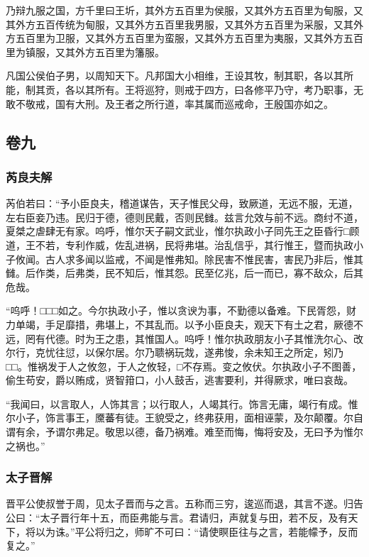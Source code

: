 \documentclass[]{article}
\begin{document}
乃辩九服之国，方千里曰王圻，其外方五百里为侯服，又其外方五百里为甸服，又其外方五百传统为甸服，又其外方五百里我男服，又其外方五百里为采服，又其外方五百里为卫服，又其外方五百里为蛮服，又其外方五百里为夷服，又其外方五百里为镇服，又其外方五百里为籓服。

凡国公侯伯子男，以周知天下。凡邦国大小相维，王设其牧，制其职，各以其所能，制其贡，各以其所有。王将巡狩，则戒于四方，曰各修平乃守，考乃职事，无敢不敬戒，国有大刑。及王者之所行道，率其属而巡戒命，王殷国亦如之。

\hypertarget{header-n343}{%
\subsection{卷九}\label{header-n343}}

\hypertarget{header-n347}{%
\subsubsection{芮良夫解}\label{header-n347}}

芮伯若曰：``予小臣良夫，稽道谋告，天子惟民父母，致厥道，无远不服，无道，左右臣妾乃违。民归于德，德则民戴，否则民雠。兹言允效与前不远。商纣不道，夏桀之虐肆无有家。呜呼，惟尔天子嗣文武业，惟尔执政小子同先王之臣昏行□顾道，王不若，专利作威，佐乱进祸，民将弗堪。治乱信乎，其行惟王，暨而执政小子攸闻。古人求多闻以监戒，不闻是惟弗知。除民害不惟民害，害民乃非后，惟其雠。后作类，后弗类，民不知后，惟其怨。民至亿兆，后一而已，寡不敌众，后其危哉。

``呜呼！□□□如之。今尔执政小子，惟以贪谀为事，不勤德以备难。下民胥怨，财力单竭，手足靡措，弗堪上，不其乱而。以予小臣良夫，观天下有土之君，厥德不远，罔有代德。时为王之患，其惟国人。呜呼！惟尔执政朋友小子其惟洗尔心、改尔行，克忧往愆，以保尔居。尔乃聩祸玩烖，遂弗悛，余未知王之所定，矧乃□□。惟祸发于人之攸忽，于人之攸轻，□不存焉。变之攸伏。尔执政小子不图善，偷生苟安，爵以贿成，贤智箝口，小人鼓舌，逃害要利，并得厥求，唯曰哀哉。

``我闻曰，以言取人，人饰其言；以行取人，人竭其行。饰言无庸，竭行有成。惟尔小子，饰言事王，黡蕃有徒。王貌受之，终弗获用，面相诬蒙，及尔颠覆。尔自谓有余，予谓尔弗足。敬思以德，备乃祸难。难至而悔，悔将安及，无曰予为惟尔之祸也。''

\hypertarget{header-n351}{%
\subsubsection{太子晋解}\label{header-n351}}

晋平公使叔誉于周，见太子晋而与之言。五称而三穷，逡巡而退，其言不遂。归告公曰：``太子晋行年十五，而臣弗能与言。君请归，声就复与田，若不反，及有天下，将以为诛。''平公将归之，师旷不可曰：``请使瞑臣往与之言，若能幪予，反而复之。''
\end{document}
